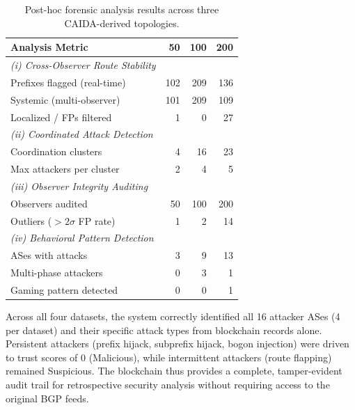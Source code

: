 \documentclass[conference]{IEEEtran}
\newcommand{\BfPara}[1]{\vspace{1mm}{\noindent\textbf{#1.}}\xspace}
\begin{document}
\begin{table}[t]
  \caption{Post-hoc forensic analysis results across three CAIDA-derived topologies.}
  \label{tab:posthoc_results}
  \begin{threeparttable}
    \footnotesize
    \setlength{\tabcolsep}{2pt}
    \begin{tabular*}{\columnwidth}{l @{\extracolsep{\fill}} rrr}
      \toprule
      \textbf{Analysis Metric} & \textbf{50} & \textbf{100} & \textbf{200} \\
      \midrule
      \textit{(i) Cross-Observer Route Stability} \\
      \quad Prefixes flagged (real-time) & 102 & 209 & 136 \\
      \quad Systemic (multi-observer)    & 101 & 209 & 109 \\
      \quad Localized / FPs filtered     & 1   & 0   & 27  \\
      \midrule
      \textit{(ii) Coordinated Attack Detection} \\
      \quad Coordination clusters        & 4   & 16  & 23  \\
      \quad Max attackers per cluster    & 2   & 4   & 5   \\
      \midrule
      \textit{(iii) Observer Integrity Auditing} \\
      \quad Observers audited            & 50  & 100 & 200 \\
      \quad Outliers ($>2\sigma$ FP rate) & 1  & 2   & 14  \\
      \midrule
      \textit{(iv) Behavioral Pattern Detection} \\
      \quad ASes with attacks            & 3   & 9   & 13  \\
      \quad Multi-phase attackers        & 0   & 3   & 1   \\
      \quad Gaming pattern detected      & 0   & 0   & 1   \\
      \bottomrule
    \end{tabular*}
  \end{threeparttable}
\end{table}

\BfPara{Forensic completeness} Across all four datasets, the system correctly identified all 16 attacker ASes (4 per dataset) and their specific attack types from blockchain records alone. Persistent attackers (prefix hijack, subprefix hijack, bogon injection) were driven to trust scores of 0 (Malicious), while intermittent attackers (route flapping) remained Suspicious. The blockchain thus provides a complete, tamper-evident audit trail for retrospective security analysis without requiring access to the original BGP feeds.
\end{document}
